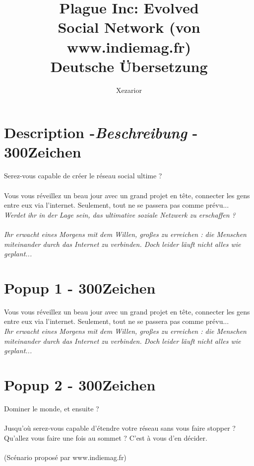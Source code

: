 \documentclass[10pt,a4paper]{article}
\author{Xezarior}
\title{Plague Inc: Evolved \\ \textbf{Social Network (von www.indiemag.fr)}\\ Deutsche Übersetzung}
\begin{document}
\maketitle


\section{Description -\emph{Beschreibung} - 300Zeichen}

Serez-vous capable de créer le réseau social ultime ?\\
\\
Vous vous réveillez un beau jour avec un grand projet en tête, connecter les gens entre eux via l'internet. Seulement, tout ne se passera pas comme prévu...\\

\textit{Werdet ihr in der Lage sein, das ultimative soziale Netzwerk zu erschaffen ? \\
\\
Ihr erwacht eines Morgens mit dem Willen, gro\ss es zu erreichen : die Menschen miteinander durch das Internet zu verbinden. Doch leider läuft nicht alles wie geplant...}



\section{Popup 1 - 300Zeichen}

Vous vous réveillez un beau jour avec un grand projet en tête, connecter les gens entre eux via l'internet. Seulement, tout ne se passera pas comme prévu...\\

\textit{Ihr erwacht eines Morgens mit dem Willen, gro\ss es zu erreichen : die Menschen miteinander durch das Internet zu verbinden. Doch leider läuft nicht alles wie geplant...}


\section{Popup 2 - 300Zeichen}

Dominer le monde, et ensuite ?\\
\\
Jusqu'où serez-vous capable d'étendre votre réseau sans vous faire stopper ? Qu'allez vous faire une fois au sommet ? C'est à vous d'en décider.\\
\\
(Scénario proposé par www.indiemag.fr)\\
\end{document}
